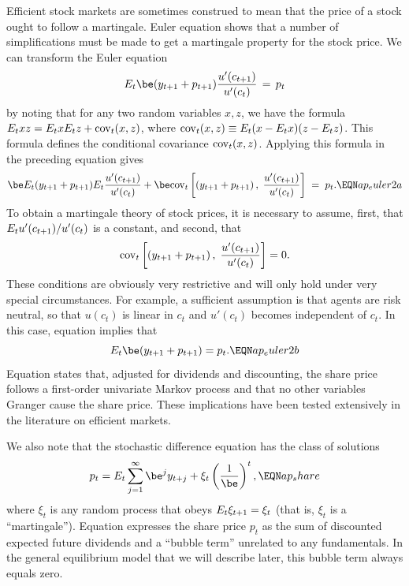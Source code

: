 Efficient stock markets are sometimes construed to mean that the price of a
stock ought to follow a martingale. Euler equation 
shows that a number of simplifications must be made to
get a martingale property for the stock price.  We can transform
the Euler equation
$$
E_t\be (y_{t+1} + p_{t+1}) {u'(c_{t+1}) \over u'(c_t)} \,=\, p_t
$$
by noting that for any two random variables $x,z$, we have the
formula $E_txz=E_tx E_tz+ {\rm cov}_t(x,z)$, where ${\rm cov}_t(x,z)
 \equiv E_t (x-E_tx)(z-E_tz)$.  This formula defines the conditional
covariance ${\rm cov}_t(x,z)$.
%
Applying this formula in the preceding equation gives
$$\be E_t (y_{t+1} + p_{t+1})  E_t {u'(c_{t+1}) \over u'(c_t)}
+\be \cov_t \left[(y_{t+1} + p_{t+1})\,,\; {u'(c_{t+1}) \over u'(c_t)} \right]
\;=\; p_t.                                          \EQN ap_euler2a   $$
To obtain a martingale theory of stock prices, it is necessary to assume,
first, that $E_t u'(c_{t+1})/u'(c_t)$ is a constant, and second, that
$${\rm cov}_t \left[(y_{t+1} + p_{t+1})\,,\; {u'(c_{t+1}) \over u'(c_t)} \right] = 0.
$$
These conditions are obviously very restrictive and will only hold under
very special circumstances. For example, a sufficient assumption is that
agents are risk neutral, so that $u(c_t)$ is linear in $c_t$ and $u'(c_t)$
becomes independent of $c_t$.  In this case, equation 
implies that
$$E_t\be (y_\tone+p_\tone) = p_t.    \EQN ap_euler2b$$
Equation  states that, adjusted for
dividends and discounting, the share price follows a first-order
univariate Markov process and that no other variables Granger cause
the share price.  These implications have been tested extensively
in the literature on efficient markets.

We also note that the stochastic difference equation  has
the class of solutions
$$p_t=E_t \sum_{j=1}^\infty \be^j y_{t+j} +\xi_t
\left({1\over\be}\right)^t,                \EQN ap_share $$
where $\xi_t$ is any random process that obeys $E_t \xi_{{t+1}}=\xi_t$ (that
is, $\xi_t$ is a ``martingale''). Equation  expresses the
share price $p_t$ as the sum of discounted expected
future dividends and a ``bubble term'' unrelated to any fundamentals. In the
general equilibrium model that we will describe later,
this bubble term always equals zero.

